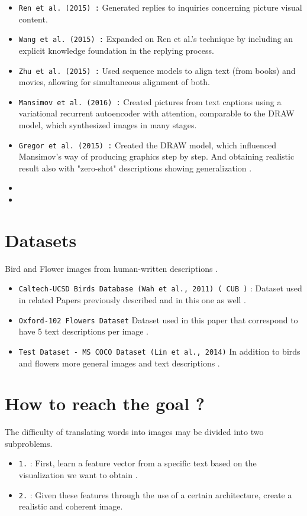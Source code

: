 \begin{itemize}[noitemsep]
    \item \texttt{Ren et al. (2015) :}
    Generated replies to inquiries concerning picture visual content.

    \item \texttt{Wang et al. (2015) :}
    Expanded on Ren et al.'s technique by including an explicit knowledge foundation in the replying process.

    \item \texttt{Zhu et al. (2015) :}
    Used sequence models to align text (from books) and movies, allowing for simultaneous alignment of both.

    \item \texttt{Mansimov et al. (2016) :}
    Created pictures from text captions using a variational recurrent autoencoder with attention, 
    comparable to the DRAW model, which synthesized images in many stages.

    \item \texttt{Gregor et al. (2015) :}
    Created the DRAW model, which influenced Mansimov's way of producing graphics step by step.
    And obtaining realistic result also with "zero-shot" descriptions showing generalization . 

    \item \texttt{}
    \item \texttt{}


\end{itemize}

\section*{Datasets}
Bird and Flower images from human-written descriptions .

\begin{itemize}[noitemsep]
    \item \texttt{Caltech-UCSD Birds Database (Wah et al., 2011) ( CUB )} : 
    Dataset used in related Papers previously described and in this one as well .
    \item \texttt{Oxford-102 Flowers Dataset}
    Dataset used in this paper that correspond to have 5 text descriptions per image .
    \item \texttt{Test Dataset - MS COCO Dataset (Lin et al., 2014)}
    In addition to birds and flowers more general images and text descriptions .
\end{itemize}

\section*{How to reach the goal ?}
The difficulty of translating words into images may be 
divided into two subproblems.
\begin{itemize}[noitemsep]
    \item \texttt{1.} : 
    First, learn a feature vector from a specific text 
    based on the visualization we want to obtain .
    \item \texttt{2.} : 
    Given these features through the use of a certain architecture, 
    create a realistic and coherent image.
\end{itemize}

